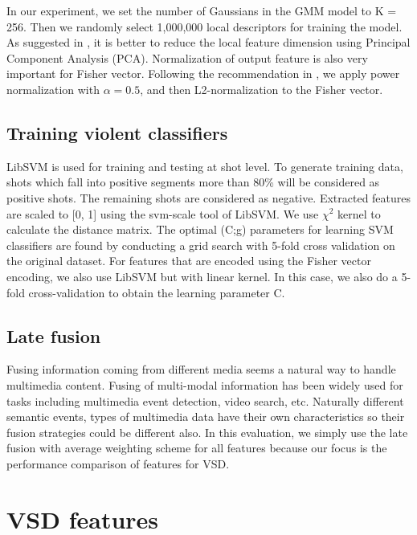 \documentclass[twocolumn]{bmcart}%
\begin{document}
In our experiment, we set the number of Gaussians in the GMM model to K = 256. Then we randomly select 1,000,000 local descriptors for training the model. As suggested in \cite{perronnin2010improving}, it is better to reduce the local feature dimension using Principal Component Analysis (PCA). Normalization of output feature is also very important for Fisher vector. Following the recommendation in \cite{perronnin2010improving}, we apply power normalization with $\alpha=0.5$, and then L2-normalization to the Fisher vector.

\subsection{Training violent classifiers}

LibSVM \cite{LibSVM} is used for training and testing at shot level. To generate training data, shots which fall into positive segments more than 80\% will be considered as positive shots. The remaining shots are considered as negative. Extracted features are scaled to [0, 1] using the svm-scale tool of LibSVM. We use $\chi^2$ kernel to calculate the distance matrix. The optimal (C;g) parameters for learning SVM classifiers are found by conducting a grid search with 5-fold cross validation on the original dataset. For features that are encoded using the Fisher vector encoding, we also use LibSVM but with linear kernel. In this case, we also do a 5-fold cross-validation to obtain the learning parameter C.

\subsection{Late fusion}
Fusing information coming from different media seems a natural way to handle multimedia content. Fusing of multi-modal information has been widely used for tasks including multimedia event detection, video search, etc. Naturally different semantic events, types of multimedia data have their own characteristics so their fusion strategies could be different also. In this evaluation, we simply use the late fusion with average weighting scheme for all features \cite{snoek2005early} because our focus is the performance comparison of features for VSD.

\section{VSD features}
\label{vsd_feature}
\end{document}
